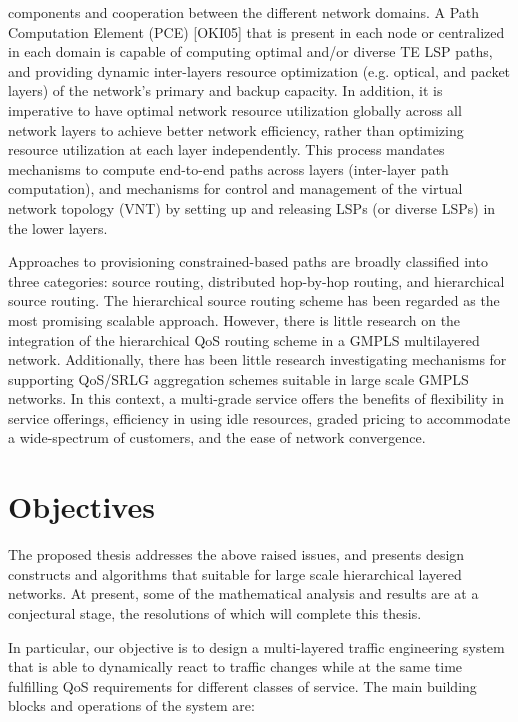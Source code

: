 components and cooperation between the different network domains. A Path Computation Element (PCE) [OKI05] that is present in each node or centralized in each domain is capable of computing optimal and/or diverse TE LSP paths, and providing dynamic inter-layers resource optimization (e.g. optical, and packet layers) of the network's primary and backup capacity. 
In addition, it is imperative to have optimal network resource utilization globally across all network layers to achieve better network efficiency, rather than optimizing resource utilization at each layer independently. This process mandates mechanisms to compute end-to-end paths across layers (inter-layer path computation), and mechanisms for control and management of the virtual network topology (VNT) by setting up and releasing LSPs (or diverse LSPs) in the lower layers.

Approaches to provisioning constrained-based paths are broadly classified into three categories: source routing, distributed hop-by-hop routing, and hierarchical source routing. The hierarchical source routing scheme has been regarded as the most promising scalable approach. However, there is little research on the integration of the hierarchical QoS routing scheme in a GMPLS multilayered network. Additionally, there has been little research investigating mechanisms for supporting QoS/SRLG aggregation schemes suitable in large scale GMPLS networks.
In this context, a multi-grade service offers the benefits of flexibility in service offerings, efficiency in using idle resources, graded pricing to accommodate a wide-spectrum of customers, and the ease of network convergence.

\section{Objectives}
The proposed thesis addresses the above raised issues, and presents design constructs and algorithms that suitable for large scale hierarchical layered networks. At present, some of the mathematical analysis and results are at a conjectural stage, the resolutions of which will complete this thesis.

In particular, our objective is to design a multi-layered traffic engineering system that is able to dynamically react to traffic changes while at the same time fulfilling QoS requirements for different classes of service. The main building blocks and operations of the system are:

